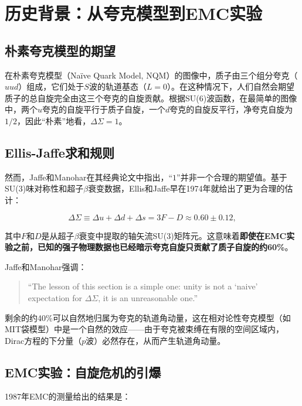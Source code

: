 \documentclass[12pt,a4paper]{ctexart}
\theoremstyle{definition}
\begin{document}
\section{历史背景：从夸克模型到EMC实验}

\subsection{朴素夸克模型的期望}

在朴素夸克模型（Na\"ive Quark Model, NQM）的图像中，质子由三个组分夸克（$uud$）组成，它们处于$S$波的轨道基态（$L=0$）。在这种情况下，人们自然会期望质子的总自旋完全由这三个夸克的自旋贡献。根据SU(6)波函数，在最简单的图像中，两个$u$夸克的自旋平行于质子自旋，一个$d$夸克的自旋反平行，净夸克自旋为$1/2$，因此``朴素''地看，$\Delta\Sigma = 1$。

\subsection{Ellis-Jaffe求和规则}

然而，Jaffe和Manohar在其经典论文\cite{JaffeManohar1990}中指出，``$1$''并非一个合理的期望值。基于SU(3)味对称性和超子$\beta$衰变数据，Ellis和Jaffe早在1974年就给出了更为合理的估计\cite{EllisJaffe}：

\begin{equation}
\Delta\Sigma \equiv \Delta u + \Delta d + \Delta s = 3F - D \approx 0.60 \pm 0.12,
\label{eq:EllisJaffe}
\end{equation}

其中$F$和$D$是从超子$\beta$衰变中提取的轴矢流SU(3)矩阵元。这意味着\textbf{即使在EMC实验之前，已知的强子物理数据也已经暗示夸克自旋只贡献了质子自旋的约60\%}。

Jaffe和Manohar强调：
\begin{quote}
``The lesson of this section is a simple one: unity is not a `naive' expectation for $\Delta\Sigma$, it is an unreasonable one.''
\end{quote}

剩余的约40\%可以自然地归属为夸克的轨道角动量，这在相对论性夸克模型（如MIT袋模型）中是一个自然的效应——由于夸克被束缚在有限的空间区域内，Dirac方程的下分量（$p$波）必然存在，从而产生轨道角动量\cite{JaffeManohar1990}。

\subsection{EMC实验：自旋危机的引爆}

1987年EMC的测量\cite{EMC}给出的结果是：
\end{document}
